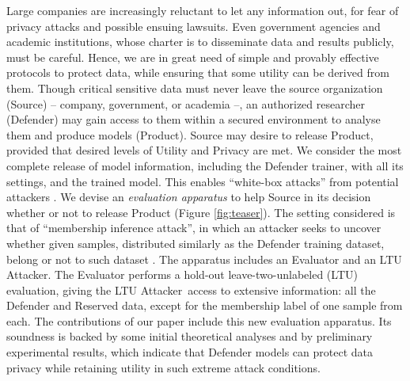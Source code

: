 \documentclass[letterpaper]{article}
\newcommand{\oracle}{LTU Attacker~}
\begin{document}
    Large companies are increasingly reluctant to let any information out, for fear of privacy attacks and possible ensuing lawsuits. Even government agencies and academic institutions, whose charter is to disseminate data and results publicly, must be careful. Hence, we are in great need of simple and provably effective protocols to protect data, while ensuring that some utility can be derived from them. Though critical sensitive data must never leave the source organization (Source) -- company, government, or academia --, an authorized researcher (Defender) may gain access to them within a secured environment to analyse them and produce models (Product). Source may desire to release Product, provided that desired levels of Utility and Privacy are met.  We consider the most complete release of model information, including the Defender trainer, with all its settings, and the trained model. This enables ``white-box attacks'' from potential attackers \cite{nasr2019comprehensive}.
    We devise an {\em evaluation apparatus} to help Source in its decision whether or not to release Product (Figure \ref{fig:teaser}). The setting considered is that of ``membership inference attack'', in which an attacker seeks to uncover whether given samples, distributed similarly as the Defender training dataset, belong or not to such dataset \cite{shokri2017membership}.
    The apparatus includes an Evaluator and an LTU Attacker. The Evaluator performs a hold-out leave-two-unlabeled (LTU) evaluation, giving the \oracle access to extensive information: all the Defender and Reserved data, except for the membership label of one sample from each. The contributions of our paper include this new evaluation apparatus. Its soundness is backed by some initial theoretical analyses and by preliminary experimental results, which indicate that Defender models can protect data privacy while retaining utility in such extreme attack conditions.


\end{document}
